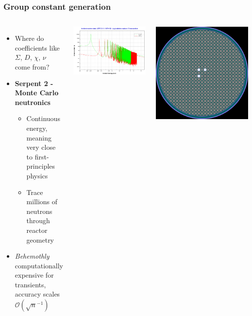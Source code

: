 \begin{frame}
  \frametitle{Group constant generation}
    \begin{columns}
    \column{5cm}
    \begin{itemize}
        \item{Where do coefficients like $\Sigma$, $D$, $\chi$, $\nu$ come from?}
        \item{\textbf{Serpent 2 - Monte Carlo neutronics}}
        \begin{itemize}
            \item{Continuous energy, meaning very close to first-principles physics}
            \item{Trace millions of neutrons through reactor geometry}
        \end{itemize}

    \item{\textit{Behemothly} computationally expensive for transients, 
        accuracy scales $\mathcal{O}(\sqrt{n}^{-1})$}
    \end{itemize}

    \includegraphics[width=\textwidth]{xsExample}

    \column{3.7cm}
    \includegraphics[width=\textwidth]{msregeom}


\end{columns}
\end{frame}
